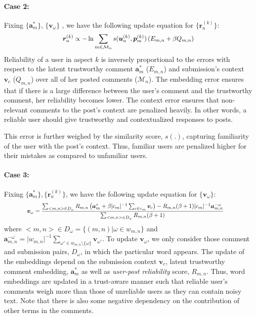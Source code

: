 \paragraph{Case 2:}
Fixing $\{ \bm{a}_m^* \}$, $\{ \bm{v}_{\omega} \}$
, we have the following update equation for $ \{\bm{r}_n^{(k)}\}$:
\begin{equation}
\resizebox{0.55\linewidth}{!}{$
\begin{aligned}
\bm{r}_n^{(k)} \propto - \ln {\sum_{m \in \mathcal{M}_n} s(\bm{u}_{n}^{(k)} , \bm{p}_{m}^{(k)}) \left( E_{m,n} + {\beta } Q_{m,n} \right)}
\end{aligned}
$}
\end{equation}
Reliability of a user in aspect $k$ is inversely proportional to the errors with respect to the latent trustworthy comment $\bm{a}_m^{*}$ ($E_{m,n}$) and submission's context $\bm{v}_c$ ($Q_{m,n}$) over all of her posted comments ($\mathcal{M}_n$). The embedding error ensures that if there is a large difference between the user's comment and the trustworthy comment, her reliability becomes lower. The context error ensures that non-relevant comments to the post's context are penalized heavily. In other words, a reliable user should give trustworthy and contextualized responses to posts.

This error is further weighed by the similarity score, $s(.)$, capturing familiarity of the user with the post's context. Thus, familiar users are penalized higher for their mistakes as compared to unfamiliar users.

\paragraph{Case 3:}
Fixing $\{ \bm{a}_m^* \}, \{\bm{r}_n^{(k)}\}$,
we have the following update equation for $\{ \bm{v}_{\omega} \}$:
\begin{equation}
\resizebox{.85\hsize}{!}{$
\begin{aligned}
 \bm{v}_{\omega} &= \frac{\sum_{<m,n> \in D_{\omega}} R_{m,n}\left( \bm{a}_m^* + \beta \vert c_m \vert^{-1} \sum_{c \in c_m} \bm{v}_c \right)
 - R_{m,n} (\beta + 1)\vert c_m \vert^{-1} \bm{a}_{m,n}^{- \omega} }{ \sum_{<m,n> \in D_{\omega}} R_{m,n}(\beta + 1)}
\end{aligned}
$}
\end{equation}
where $<m,n> \in D_{\omega} = \{ (m,n) \vert \omega \in w_{m,n} \}$ and $\bm{a}_{m,n}^{-\omega} = \vert w_{m, n} \vert^{-1} \sum_{\omega' \in w_{m,n} \setminus \{ \omega \} } \bm{v}_{\omega'}$. To update $\bm{v}_\omega$, we only consider those comment and submission pairs, $D_{\omega}$, in which the particular word appears.
The update of the embeddings depend on the submission context $\bm{v}_c$, latent trustworthy comment embedding, $\bm{a}_m^*$ as well as \emph{user-post reliability} score, $R_{m,n}$. Thus, word embeddings are updated in a trust-aware manner such that reliable user's comments weigh more than those of unreliable users as they can contain noisy text. Note that there is also some negative dependency on the contribution of other terms in the comments.

